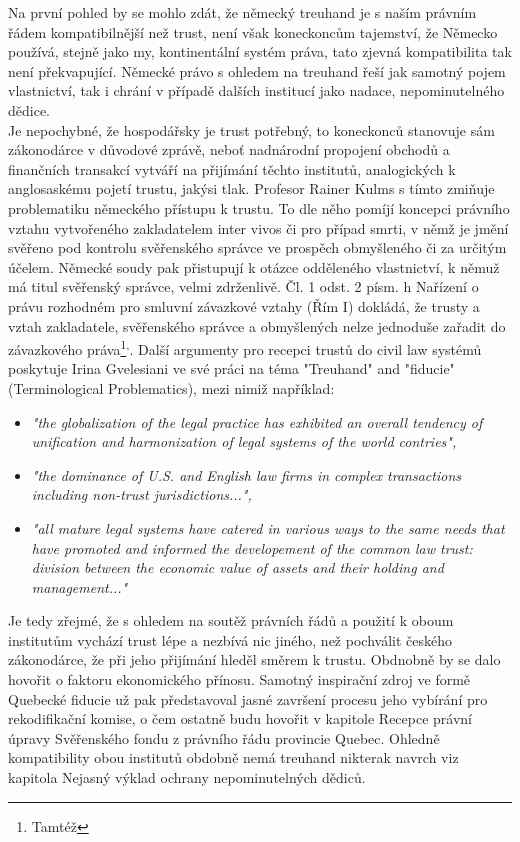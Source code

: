 \documentclass{article}
\begin{document}
 Na první pohled by se mohlo zdát, že německý treuhand je s naším právním řádem kompatibilnější než trust, není však koneckoncům tajemství, že Německo používá, stejně jako my, kontinentální systém práva, tato zjevná kompatibilita tak není překvapující. Německé právo s ohledem na treuhand řeší jak samotný pojem vlastnictví, tak i chrání v případě dalších institucí jako nadace, nepominutelného dědice.\\
 
 Je nepochybné, že hospodářsky je trust potřebný, to koneckonců stanovuje sám zákonodárce v důvodové zprávě, neboť nadnárodní propojení obchodů a finančních transakcí vytváří na přijímání těchto institutů, analogických k anglosaskému pojetí trustu, jakýsi tlak. Profesor Rainer Kulms s tímto zmiňuje problematiku německého přístupu k trustu. To dle něho pomíjí koncepci právního vztahu vytvořeného zakladatelem inter vivos či pro případ smrti, v němž je jmění svěřeno pod kontrolu svěřenského správce ve prospěch obmyšleného či za určitým účelem. Německé soudy pak přistupují k otázce odděleného vlastnictví, k němuž má titul svěřenský správce, velmi zdrženlivě. Čl. 1 odst. 2 písm. h Nařízení o právu rozhodném pro smluvní závazkové vztahy (Řím I) dokládá, že trusty a vztah zakladatele, svěřenského správce a obmyšlených nelze jednoduše zařadit do závazkového práva\footnote{Tamtéž}\textsuperscript{,}. Další argumenty pro recepci trustů do civil law systémů poskytuje Irina Gvelesiani ve své práci na téma "Treuhand" and "fiducie" (Terminological Problematics), mezi nimiž například:\\
 
 \begin{itemize}
 \item \textit{"the globalization of the legal practice has exhibited an overall tendency of unification and harmonization of legal systems of the world contries",}	
 \item \textit{"the dominance of U.S. and English law firms in complex transactions including non-trust jurisdictions...",}
 \item \textit{"all mature legal systems have catered in various ways to the same needs that have promoted and informed the developement of the common law trust: division between the economic value of assets and their holding and management..."}
 \end{itemize}

Je tedy zřejmé, že s ohledem na soutěž právních řádů a použití k oboum institutům vychází trust lépe a nezbívá nic jiného, než pochválit českého zákonodárce, že při jeho přijímání hleděl směrem k trustu. Obdnobně by se dalo hovořit o faktoru ekonomického přínosu. Samotný inspirační zdroj ve formě Quebecké fiducie už pak představoval jasné završení procesu jeho vybírání pro rekodifikační komise, o čem ostatně budu hovořit v kapitole Recepce právní úpravy Svěřenského fondu z právního řádu provincie Quebec. Ohledně kompatibility obou institutů obdobně nemá treuhand nikterak navrch viz kapitola Nejasný výklad ochrany nepominutelných dědiců.\\
\end{document}
